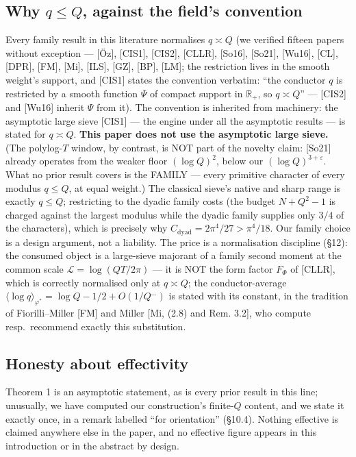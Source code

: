 \documentclass[11pt]{amsart}
\theoremstyle{plain}
\theoremstyle{remark}
\begin{document}
\subsection{Why $q \le Q$, against the field's convention}

Every family result in this literature normalises $q \asymp Q$ (we verified fifteen
papers without exception --- [\"Oz], [CIS1], [CIS2], [CLLR], [So16], [So21], [Wu16],
[CL], [DPR], [FM], [Mi], [ILS], [GZ], [BP], [LM]; the restriction lives in the smooth
weight's support, and [CIS1] states the convention verbatim: ``the conductor $q$ is
restricted by a smooth function $\Psi$ of compact support in $\mathbb{R}_{+}$, so
$q \asymp Q$'' --- [CIS2] and [Wu16] inherit $\Psi$ from it). The convention is
inherited from machinery: the asymptotic large sieve [CIS1] --- the engine under all
the asymptotic results --- is stated for $q \asymp Q$. \textbf{This paper does not use
the asymptotic large sieve.} (The polylog-$T$ window, by contrast, is NOT part of the
novelty claim: [So21] already operates from the weaker floor $(\log Q)^{2}$, below our
$(\log Q)^{3+\varepsilon}$. What no prior result covers is the FAMILY --- every
primitive character of every modulus $q \le Q$, at equal weight.) The classical
sieve's native and sharp range is exactly $q \le Q$; restricting to the dyadic family
costs (the budget $N + Q^2 - 1$ is charged against the largest modulus while the
dyadic family supplies only $3/4$ of the characters), which is precisely why
$C_{\mathrm{dyad}} = 2\pi^4/27 > \pi^4/18$. Our family choice is a design argument,
not a liability. The price is a normalisation discipline (\S12): the consumed object
is a large-sieve majorant of a family second moment at the common scale
$\mathcal{L} = \log(QT/2\pi)$ --- it is NOT the form factor $F_\Phi$ of [CLLR], which
is correctly normalised only at $q \asymp Q$; the conductor-average
$\langle \log q\rangle_{\varphi^{*}} = \log Q - 1/2 + O(1/Q^{\dots})$ is stated with
its constant, in the tradition of Fiorilli--Miller [FM] and Miller [Mi, (2.8) and
Rem. 3.2], who compute resp.\ recommend exactly this substitution.

\subsection{Honesty about effectivity}

Theorem 1 is an asymptotic statement, as is every prior result in this line; unusually,
we have computed our construction's finite-$Q$ content, and we state it exactly once,
in a remark labelled ``for orientation'' (\S10.4). Nothing effective is claimed
anywhere else in the paper, and no effective figure appears in this introduction or in
the abstract by design.
\end{document}
